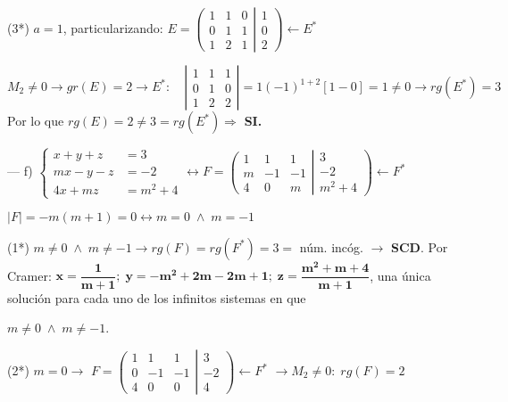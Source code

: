 \begin{proofw}
\noindent (3*) $a=1$, particularizando: $E=\left( \begin{matrix}  \boxed{1}&\boxed{1}&0\\\boxed{0}&\boxed{1}&1\\1&2&1      \end{matrix} \right|  \left.    \begin{matrix}   1\\0\\2 \end{matrix} \right) \leftarrow E^*$

\noindent $\boxed{M_2}\neq 0 \to gr(E)=2\to E^*: \quad \left| \begin{matrix} 1&1&1 \\ 0&1&0 \\ 1&2&2 \end{matrix} \right|= 1(-1)^{1+2} [1-0]=1\neq 0 \to rg(E^*)=3 $ Por lo que $rg(E)=2\neq 3=rg(E^*) \Rightarrow $ \textbf{ SI.}



\noindent --- f) $\begin{cases}  x+y+z&=3\\ mx-y-z&=-2 \\4x+mz&=m^2+4   \end{cases} \leftrightarrow F=\left( \begin{matrix}   1&1&1\\m&-1&-1\\4&0&m     \end{matrix} \right|  \left.    \begin{matrix} 3\\-2\\m^2+4   \end{matrix} \right) \leftarrow F^*$

\noindent $|F|=-m(m+1)=0 \leftrightarrow m=0 \; \wedge \; m=-1$

\noindent (1*) $m\neq 0 \; \wedge \; m\neq -1 \to rg(F)=rg(F^*)=3=$ núm. incóg. $\to$  \textbf{SCD}. Por Cramer: $\boldsymbol{x=\dfrac {1}{m+1}; \; y={-m^2+2m-2}{m+1}; \; z=\dfrac{m^2+m+4}{m+1}}$, una única solución para cada uno de los infinitos sistemas en que 

\noindent $ m\neq 0 \; \wedge \; m\neq -1 $.

\noindent (2*) $m=0 \to  $ \small{$F=\left( \begin{matrix}   \boxed{1}&\boxed{1}&1\\\boxed{0}&\boxed{-1}&-1\\4&0&0     \end{matrix} \right|  \left.    \begin{matrix} 3\\-2\\4   \end{matrix} \right) \leftarrow F^*$} $ \to \boxed{M_2}\neq 0:\; rg(F)=2$


\end{proofw}
